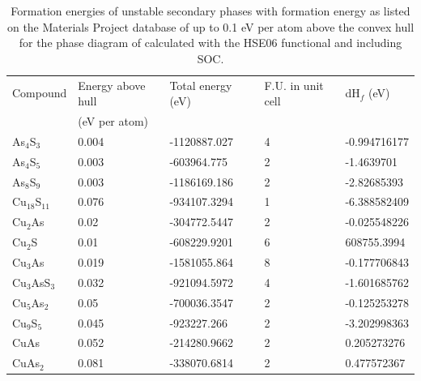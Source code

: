 \documentclass[11pt, twoside]{report}
\begin{document}
\begin{table}[]
\begin{tabular}{@{}lllll@{}}
\toprule
Compound & Energy above hull  & Total energy (eV) & F.U. in unit cell & dH$_f$ (eV)   \\ 
         & (eV per atom)      &                   &                   &               \\ \midrule
As$_4$S$_3$    & 0.004                           & -1120887.027      & 4                 & -0.994716177 \\
As$_4$S$_5$    & 0.003                           & -603964.775       & 2                 & -1.4639701   \\
As$_8$S$_9$    & 0.003                           & -1186169.186      & 2                 & -2.82685393  \\
Cu$_{18}$S$_{11}$  & 0.076                           & -934107.3294      & 1                 & -6.388582409 \\
Cu$_2$As    & 0.02                            & -304772.5447      & 2                 & -0.025548226 \\
Cu$_2$S     & 0.01                            & -608229.9201      & 6                 & 608755.3994  \\
Cu$_3$As    & 0.019                           & -1581055.864      & 8                 & -0.177706843 \\
Cu$_3$AsS$_3$  & 0.032                           & -921094.5972      & 4                 & -1.601685762 \\
Cu$_5$As$_2$   & 0.05                            & -700036.3547      & 2                 & -0.125253278 \\
Cu$_9$S$_5$    & 0.045                           & -923227.266       & 2                 & -3.202998363 \\
CuAs     & 0.052                           & -214280.9662      & 2                 & 0.205273276  \\
CuAs$_2$    & 0.081                           & -338070.6814      & 2                 & 0.477572367  \\ \bottomrule
\end{tabular}
\caption{Formation energies of unstable secondary phases with formation energy as listed on the Materials Project database of up to 0.1 eV per atom above the convex hull for the phase diagram of {\enargite} calculated with the HSE06 functional and including SOC.}\label{enargite_above_hull}
\end{table}
\end{document}
